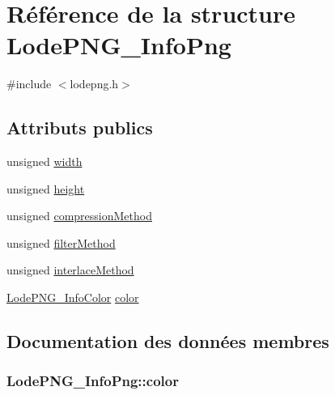 \hypertarget{struct_lode_p_n_g___info_png}{}\section{Référence de la structure Lode\+P\+N\+G\+\_\+\+Info\+Png}
\label{struct_lode_p_n_g___info_png}


{\ttfamily \#include $<$lodepng.\+h$>$}

\subsection*{Attributs publics}
\begin{DoxyCompactItemize}
\item 
unsigned \hyperlink{struct_lode_p_n_g___info_png_a74be99b177b28f3178c02139c4b7f149}{width}
\item 
unsigned \hyperlink{struct_lode_p_n_g___info_png_a4b87ec9649e7177af7a5f5e08e5bc491}{height}
\item 
unsigned \hyperlink{struct_lode_p_n_g___info_png_a177065a8eeb66398a89ed93e7c2b2f50}{compression\+Method}
\item 
unsigned \hyperlink{struct_lode_p_n_g___info_png_a101ffbacd7026dad4ab062e984cecf17}{filter\+Method}
\item 
unsigned \hyperlink{struct_lode_p_n_g___info_png_ad261cbe064eb69a92638e880d99347ca}{interlace\+Method}
\item 
\hyperlink{struct_lode_p_n_g___info_color}{Lode\+P\+N\+G\+\_\+\+Info\+Color} \hyperlink{struct_lode_p_n_g___info_png_acce58518f72f42ba94db4c1cfd69336b}{color}
\end{DoxyCompactItemize}


\subsection{Documentation des données membres}
\hypertarget{struct_lode_p_n_g___info_png_acce58518f72f42ba94db4c1cfd69336b}{}
\subsubsection[{color}]{ Lode\+P\+N\+G\+\_\+\+Info\+Png\+::color}\label{struct_lode_p_n_g___info_png_acce58518f72f42ba94db4c1cfd69336b}
\hypertarget{struct_lode_p_n_g___info_png_a177065a8eeb66398a89ed93e7c2b2f50}{}
